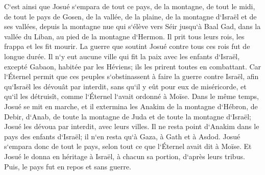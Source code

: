 \verse C`est ainsi que Josué s`empara de tout ce pays, de la montagne, de tout le midi, de tout le pays de Gosen, de la vallée, de la plaine, de la montagne d`Israël et de ses vallées, 
\verse depuis la montagne nue qui s`élève vers Séir jusqu`à Baal Gad, dans la vallée du Liban, au pied de la montagne d`Hermon. Il prit tous leurs rois, les frappa et les fit mourir. 
\verse La guerre que soutint Josué contre tous ces rois fut de longue durée. 
\verse Il n`y eut aucune ville qui fit la paix avec les enfants d`Israël, excepté Gabaon, habitée par les Héviens; ils les prirent toutes en combattant. 
\verse Car l`Éternel permit que ces peuples s`obstinassent à faire la guerre contre Israël, afin qu`Israël les dévouât par interdit, sans qu`il y eût pour eux de miséricorde, et qu`il les détruisît, comme l`Éternel l`avait ordonné à Moïse. 
\verse Dans le même temps, Josué se mit en marche, et il extermina les Anakim de la montagne d`Hébron, de Debir, d`Anab, de toute la montagne de Juda et de toute la montagne d`Israël; Josué les dévoua par interdit, avec leurs villes. 
\verse Il ne resta point d`Anakim dans le pays des enfants d`Israël; il n`en resta qu`à Gaza, à Gath et à Asdod. 
\verse Josué s`empara donc de tout le pays, selon tout ce que l`Éternel avait dit à Moïse. Et Josué le donna en héritage à Israël, à chacun sa portion, d`après leurs tribus. Puis, le pays fut en repos et sans guerre. 

